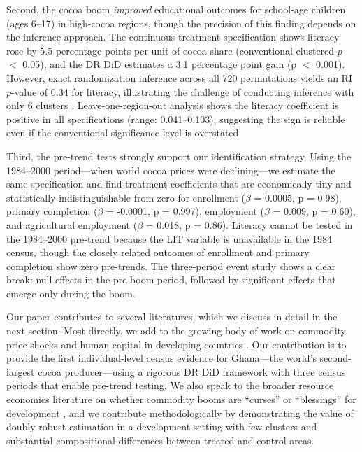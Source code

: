 \documentclass[12pt]{article}
\begin{document}
Second, the cocoa boom \textit{improved} educational outcomes for school-age children (ages 6--17) in high-cocoa regions, though the precision of this finding depends on the inference approach. The continuous-treatment specification shows literacy rose by 5.5 percentage points per unit of cocoa share (conventional clustered $p$ $<$ 0.05), and the DR DiD estimates a 3.1 percentage point gain (p $<$ 0.001). However, exact randomization inference across all 720 permutations yields an RI $p$-value of 0.34 for literacy, illustrating the challenge of conducting inference with only 6 clusters \citep{cameron2008}. Leave-one-region-out analysis shows the literacy coefficient is positive in all specifications (range: 0.041--0.103), suggesting the sign is reliable even if the conventional significance level is overstated.

Third, the pre-trend tests strongly support our identification strategy. Using the 1984--2000 period---when world cocoa prices were declining---we estimate the same specification and find treatment coefficients that are economically tiny and statistically indistinguishable from zero for enrollment ($\beta$ = 0.0005, p = 0.98), primary completion ($\beta$ = -0.0001, p = 0.997), employment ($\beta$ = 0.009, p = 0.60), and agricultural employment ($\beta$ = 0.018, p = 0.86). Literacy cannot be tested in the 1984--2000 pre-trend because the LIT variable is unavailable in the 1984 census, though the closely related outcomes of enrollment and primary completion show zero pre-trends. The three-period event study shows a clear break: null effects in the pre-boom period, followed by significant effects that emerge only during the boom.

Our paper contributes to several literatures, which we discuss in detail in the next section. Most directly, we add to the growing body of work on commodity price shocks and human capital in developing countries \citep{kruger2007, edmonds2005, cogneau2012, beegle2006, shah2017}. Our contribution is to provide the first individual-level census evidence for Ghana---the world's second-largest cocoa producer---using a rigorous DR DiD framework with three census periods that enable pre-trend testing. We also speak to the broader resource economics literature on whether commodity booms are ``curses'' or ``blessings'' for development \citep{vanderploeg2011, sachs2001}, and we contribute methodologically by demonstrating the value of doubly-robust estimation \citep{santanna2020} in a development setting with few clusters and substantial compositional differences between treated and control areas.
\end{document}

